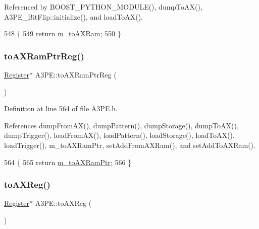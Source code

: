 Referenced by B\+O\+O\+S\+T\+\_\+\+P\+Y\+T\+H\+O\+N\+\_\+\+M\+O\+D\+U\+L\+E(), dump\+To\+A\+X(), A3\+P\+E\+\_\+\+Bit\+Flip\+::initialize(), and load\+To\+A\+X().


\begin{DoxyCode}
548                 \{
549     \textcolor{keywordflow}{return} \hyperlink{classA3PE_ae586a3d2fd21556e84e1af656e3430b5}{m\_toAXRam};
550   \}
\end{DoxyCode}
\mbox{\label{classA3PE_af6e9e980e871fcf0e1b35e1b4ae95ebe}} 
\subsubsection{\texorpdfstring{to\+A\+X\+Ram\+Ptr\+Reg()}{toAXRamPtrReg()}}
{\footnotesize\ttfamily \hyperlink{classRegister}{Register}$\ast$ A3\+P\+E\+::to\+A\+X\+Ram\+Ptr\+Reg (\begin{DoxyParamCaption}{ }\end{DoxyParamCaption})\hspace{0.3cm}{\ttfamily [inline]}}



Definition at line 564 of file A3\+P\+E.\+h.



References dump\+From\+A\+X(), dump\+Pattern(), dump\+Storage(), dump\+To\+A\+X(), dump\+Trigger(), load\+From\+A\+X(), load\+Pattern(), load\+Storage(), load\+To\+A\+X(), load\+Trigger(), m\+\_\+to\+A\+X\+Ram\+Ptr, set\+Add\+From\+A\+X\+Ram(), and set\+Add\+To\+A\+X\+Ram().


\begin{DoxyCode}
564                            \{
565     \textcolor{keywordflow}{return} \hyperlink{classA3PE_aae1b8b2e96bba94535bd4de766bd7e65}{m\_toAXRamPtr};
566   \}
\end{DoxyCode}
\mbox{\label{classA3PE_a43b0006fafa3aeae353abb2ac30e872c}} 
\subsubsection{\texorpdfstring{to\+A\+X\+Reg()}{toAXReg()}}
{\footnotesize\ttfamily \hyperlink{classRegister}{Register}$\ast$ A3\+P\+E\+::to\+A\+X\+Reg (\begin{DoxyParamCaption}{ }\end{DoxyParamCaption})\hspace{0.3cm}{\ttfamily [inline]}}



